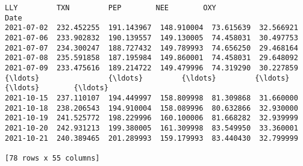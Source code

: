 \documentclass[11pt]{article}
\begin{document}
\begin{tcolorbox}[breakable, size=fbox, boxrule=.5pt, pad at break*=1mm, opacityfill=0]
\begin{Verbatim}[commandchars=\\\{\}]
                   LLY         TXN         PEP        NEE        OXY
Date
2021-07-02  232.452255  191.143967  148.910004  73.615639  32.566921
2021-07-06  233.902832  190.139557  149.130005  74.458031  30.497753
2021-07-07  234.300247  188.727432  149.789993  74.656250  29.468164
2021-07-08  235.591858  187.195984  149.860001  74.458031  29.648092
2021-07-09  233.475616  189.214722  149.479996  74.319290  30.227859
{\ldots}                {\ldots}         {\ldots}         {\ldots}        {\ldots}        {\ldots}
2021-10-15  237.110107  194.449997  158.809998  81.309868  31.660000
2021-10-18  238.206543  194.910004  158.089996  80.632866  32.930000
2021-10-19  241.525772  198.229996  160.100006  81.668282  32.939999
2021-10-20  242.931213  199.380005  161.309998  83.549950  33.360001
2021-10-21  240.389465  201.289993  159.179993  83.440430  32.799999

[78 rows x 55 columns]
\end{Verbatim}
\end{tcolorbox}
        
\end{document}
